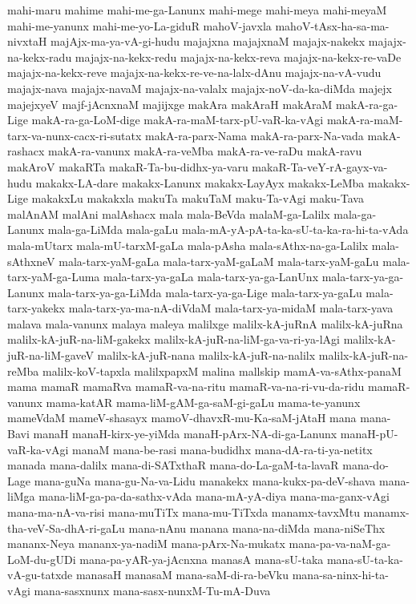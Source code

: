{mahi-maru
mahime
mahi-me-ga-Lanunx
mahi-mege
mahi-meya
mahi-meyaM
mahi-me-yanunx
mahi-me-yo-La-giduR
mahoV-javxla
mahoV-tAsx-ha-sa-ma-nivxtaH
majAjx-ma-ya-vA-gi-hudu
majajxna
majajxnaM
majajx-nakekx
majajx-na-kekx-radu
majajx-na-kekx-redu
majajx-na-kekx-reva
majajx-na-kekx-re-vaDe
majajx-na-kekx-reve
majajx-na-kekx-re-ve-na-lalx-dAnu
majajx-na-vA-vudu
majajx-nava
majajx-navaM
majajx-na-valalx
majajx-noV-da-ka-diMda
majejx
majejxyeV
majf-jAcnxnaM
majijxge
makAra
makAraH
makAraM
makA-ra-ga-Lige
makA-ra-ga-LoM-dige
makA-ra-maM-tarx-pU-vaR-ka-vAgi
makA-ra-maM-tarx-va-nunx-cacx-ri-sutatx
makA-ra-parx-Nama
makA-ra-parx-Na-vada
makA-rashacx
makA-ra-vanunx
makA-ra-veMba
makA-ra-ve-raDu
makA-ravu
makAroV
makaRTa
makaR-Ta-bu-didhx-ya-varu
makaR-Ta-veY-rA-gayx-va-hudu
makakx-LA-dare
makakx-Lanunx
makakx-LayAyx
makakx-LeMba
makakx-Lige
makakxLu
makakxla
makuTa
makuTaM
maku-Ta-vAgi
maku-Tava
malAnAM
malAni
malAshacx
mala
mala-BeVda
malaM-ga-Lalilx
mala-ga-Lanunx
mala-ga-LiMda
mala-gaLu
mala-mA-yA-pA-ta-ka-sU-ta-ka-ra-hi-ta-vAda
mala-mUtarx
mala-mU-tarxM-gaLa
mala-pAsha
mala-sAthx-na-ga-Lalilx
mala-sAthxneV
mala-tarx-yaM-gaLa
mala-tarx-yaM-gaLaM
mala-tarx-yaM-gaLu
mala-tarx-yaM-ga-Luma
mala-tarx-ya-gaLa
mala-tarx-ya-ga-LanUnx
mala-tarx-ya-ga-Lanunx
mala-tarx-ya-ga-LiMda
mala-tarx-ya-ga-Lige
mala-tarx-ya-gaLu
mala-tarx-yakekx
mala-tarx-ya-ma-nA-diVdaM
mala-tarx-ya-midaM
mala-tarx-yava
malava
mala-vanunx
malaya
maleya
malilxge
malilx-kA-juRnA
malilx-kA-juRna
malilx-kA-juR-na-liM-gakekx
malilx-kA-juR-na-liM-ga-va-ri-ya-lAgi
malilx-kA-juR-na-liM-gaveV
malilx-kA-juR-nana
malilx-kA-juR-na-nalilx
malilx-kA-juR-na-reMba
malilx-koV-tapxla
malilxpapxM
malina
mallskip
mamA-va-sAthx-panaM
mama
mamaR
mamaRva
mamaR-va-na-ritu
mamaR-va-na-ri-vu-da-ridu
mamaR-vanunx
mama-katAR
mama-liM-gAM-ga-saM-gi-gaLu
mama-te-yanunx
mameVdaM
mameV-shasayx
mamoV-dhavxR-mu-Ka-saM-jAtaH
mana
mana-Bavi
manaH
manaH-kirx-ye-yiMda
manaH-pArx-NA-di-ga-Lanunx
manaH-pU-vaR-ka-vAgi
manaM
mana-be-rasi
mana-budidhx
mana-dA-ra-ti-ya-netitx
manada
mana-dalilx
mana-di-SATxthaR
mana-do-La-gaM-ta-lavaR
mana-do-Lage
mana-guNa
mana-gu-Na-va-Lidu
manakekx
mana-kukx-pa-deV-shava
mana-liMga
mana-liM-ga-pa-da-sathx-vAda
mana-mA-yA-diya
mana-ma-ganx-vAgi
mana-ma-nA-va-risi
mana-muTiTx
mana-mu-TiTxda
manamx-tavxMtu
manamx-tha-veV-Sa-dhA-ri-gaLu
mana-nAnu
manana
mana-na-diMda
mana-niSeThx
mananx-Neya
mananx-ya-nadiM
mana-pArx-Na-mukatx
mana-pa-va-naM-ga-LoM-du-gUDi
mana-pa-yAR-ya-jAcnxna
manasA
mana-sU-taka
mana-sU-ta-ka-vA-gu-tatxde
manasaH
manasaM
mana-saM-di-ra-beVku
mana-sa-ninx-hi-ta-vAgi
mana-sasxnunx
mana-sasx-nunxM-Tu-mA-Duva
}
